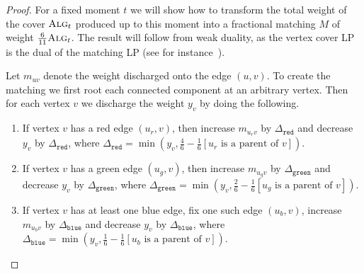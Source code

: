 \documentclass[a4paper,USenglish,cleveref,autoref,thm-restate,pdfa]{lipics-v2021}
\newcommand{\cred}{\texttt{red}}
\newcommand{\cblue}{\texttt{blue}}
\newcommand{\cgreen}{\texttt{green}}
\newcommand{\dr}{\Delta_{\cred}}
\newcommand{\dg}{\Delta_{\cgreen}}
\newcommand{\db}{\Delta_{\cblue}}
\newcommand{\alg}{\textsc{Alg}\xspace}
\begin{document}
\begin{proof}
  For a fixed moment $t$ we will show how to transform the total weight of the cover $\alg_t$ produced up to this moment into a fractional matching $M$ of weight $\frac{6}{11}\alg_t$.
  The result will follow from weak duality, as the vertex cover LP is the dual of the matching LP (see for instance~\cite{DevanurJainKleinberg13}).
  
  Let $m_{uv}$ denote the weight discharged onto the edge $(u,v)$.
  To create the matching we first root each connected component at an arbitrary vertex.
  Then for each vertex $v$ we discharge the weight $y_v$ by doing the following.

  \begin{enumerate}
    \item If vertex $v$ has a red edge $(u_r, v)$, then increase $m_{u_r v}$ by $\dr$ and decrease $y_v$ by $\dr$, where $\dr = \min(y_v, \frac{4}{6} - \frac{1}{6}[u_r \text{ is a parent of } v])$.
      
    \item If vertex $v$ has a green edge $(u_g, v)$, then increase $m_{u_g v}$ by $\dg$ and decrease $y_v$ by $\dg$, where $\dg = \min(y_v, \frac{2}{6} - \frac{1}{6}[u_g \text{ is a parent of } v])$.

    \item If vertex $v$ has at least one blue edge, fix one such edge $(u_b, v)$, increase $m_{u_b v}$ by $\db$ and decrease $y_v$ by $\db$, where $\db = \min(y_v, \frac{1}{6} - \frac{1}{6}[u_b \text{ is a parent of } v])$.
  \end{enumerate}


\end{proof}
\end{document}
